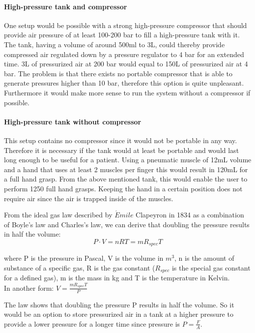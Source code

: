 \documentclass[main]{subfiles}
\begin{document}
\paragraph{High-pressure tank and compressor}

One setup would be possible with a strong high-pressure compressor that should provide air pressure of at least 100-200 bar to fill a high-pressure tank with it. The tank, having a volume of around 500ml to 3L, could thereby provide compressed air regulated down by a pressure regulator to 4 bar for an extended time. 3L of pressurized air at 200 bar would equal to 150L of pressurized air at 4 bar. The problem is that there exists no portable compressor that is able to generate pressures higher than 10 bar, therefore this option is quite unpleasant. Furthermore it would make more sense to run the system without a compressor if possible.

\paragraph{High-pressure tank without compressor}
\label{pressure-tank}

This setup contains no compressor since it would not be portable in any way. Therefore it is necessary if the tank would at least be portable and would last long enough to be useful for a patient. Using a pneumatic muscle of 12mL volume and a hand that uses at least 2 muscles per finger this would result in 120mL for a full hand grasp. From the above mentioned tank, this would enable the user to perform 1250 full hand grasps. Keeping the hand in a certain position does not require air since the air is trapped inside of the muscles.

 From the ideal gas law described by $\acute{E}mile$ Clapeyron in 1834 as a combination of Boyle's law and Charles's law, we can derive that doubling the pressure results in half the volume:
\[P \cdot V = nRT = mR_{spec}T\]

where P is the pressure in Pascal, V is the volume in $m^3$, n is the amount of substance of a specific gas, R is the gas constant ($R_{spec}$ is the special gas constant for a defined gas), m is the mass in kg and T is the temperature in Kelvin.\\

In another form: $V = \frac{mR_{spec}T}{P}$

The law shows that doubling the pressure P results in half the volume. So it would be an option to store pressurized air in a tank at a higher pressure to provide a lower pressure for a longer time since pressure is $P = \frac{F}{A}$.
\end{document}
